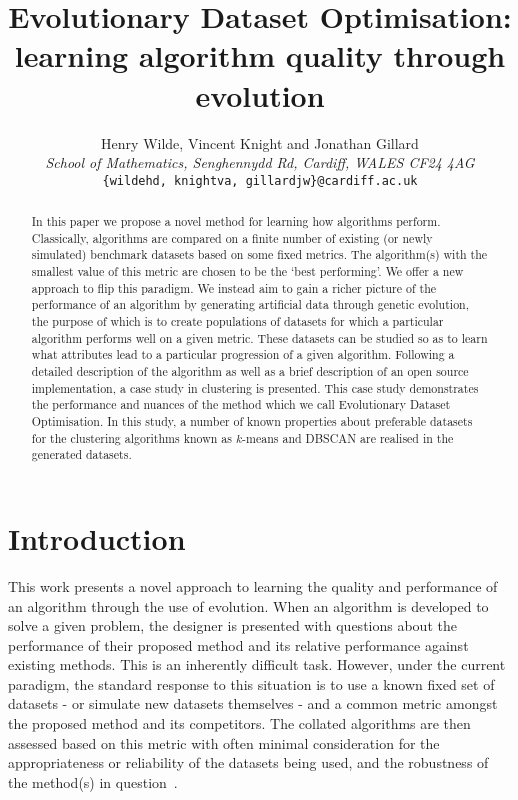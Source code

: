 \documentclass[11pt]{article}
\title{%
    Evolutionary Dataset Optimisation:
    learning algorithm quality through evolution
}
\author{Henry Wilde, Vincent Knight and Jonathan Gillard \\
    \textit{School of Mathematics, Senghennydd Rd, Cardiff, WALES CF24 4AG} \\
    \texttt{\{wildehd, knightva, gillardjw\}@cardiff.ac.uk}
}
\begin{document}


\maketitle%


\begin{abstract}
    In this paper we propose a novel method for learning how algorithms perform.
    Classically, algorithms are compared on a finite number of existing (or
    newly simulated) benchmark datasets based on some fixed metrics. The
    algorithm(s) with the smallest value of this metric are chosen to be the
    `best performing'. We offer a new approach to flip this paradigm. We
    instead aim to gain a richer picture of the performance of an algorithm by
    generating artificial data through genetic evolution, the purpose of which
    is to create populations of datasets for which a particular algorithm
    performs well on a given metric. These datasets can be studied so as to
    learn what attributes lead to a particular progression of a given algorithm.
    Following a detailed description of the algorithm as well as a brief
    description of an open source implementation, a case study in clustering is
    presented. This case study demonstrates the performance and nuances of the
    method which we call Evolutionary Dataset Optimisation. In this study, a
    number of known properties about preferable datasets for the clustering
    algorithms known as \(k\)-means and DBSCAN are realised in the generated 
    datasets.
\end{abstract}


\section{Introduction}\label{section:introduction}

This work presents a novel approach to learning the quality and performance of
an algorithm through the use of evolution. When an algorithm is developed to
solve a given problem, the designer is presented with questions about the
performance of their proposed method and its relative performance against
existing methods. This is an inherently difficult task. However, under the
current paradigm, the standard response to this situation is to use a known
fixed set of datasets \-- or simulate new datasets themselves \-- and a common
metric amongst the proposed method and its competitors. The collated algorithms
are then assessed based on this metric with often minimal consideration for
the appropriateness or reliability of the datasets being used, and the
robustness of the method(s) in question~\cite{Abualigah2018a,Huang1998,Liu2016}.
\end{document}
